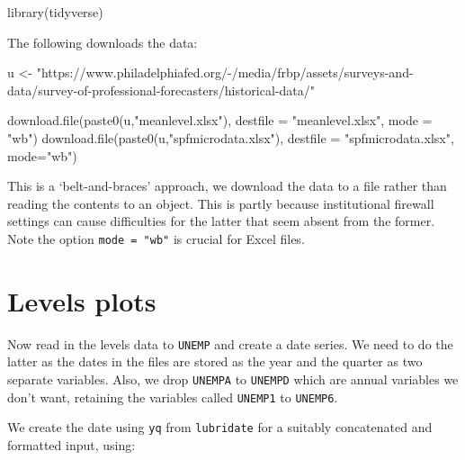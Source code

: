 \documentclass[
  letterpaper,
]{book}
\newenvironment{Shaded}{\begin{snugshade}}{\end{snugshade}}
\newcommand{\AttributeTok}[1]{\textcolor[rgb]{0.40,0.45,0.13}{#1}}
\newcommand{\FunctionTok}[1]{\textcolor[rgb]{0.28,0.35,0.67}{#1}}
\newcommand{\NormalTok}[1]{\textcolor[rgb]{0.00,0.23,0.31}{#1}}
\newcommand{\OtherTok}[1]{\textcolor[rgb]{0.00,0.23,0.31}{#1}}
\newcommand{\StringTok}[1]{\textcolor[rgb]{0.13,0.47,0.30}{#1}}
\begin{document}
\begin{Shaded}
\begin{Highlighting}[]
\FunctionTok{library}\NormalTok{(tidyverse)}
\end{Highlighting}
\end{Shaded}

The following downloads the data:

\begin{Shaded}
\begin{Highlighting}[]
\NormalTok{u }\OtherTok{\textless{}{-}} \StringTok{"https://www.philadelphiafed.org/{-}/media/frbp/assets/surveys{-}and{-}data/survey{-}of{-}professional{-}forecasters/historical{-}data/"}

\FunctionTok{download.file}\NormalTok{(}\FunctionTok{paste0}\NormalTok{(u,}\StringTok{"meanlevel.xlsx"}\NormalTok{), }\AttributeTok{destfile =} \StringTok{"meanlevel.xlsx"}\NormalTok{, }\AttributeTok{mode =} \StringTok{"wb"}\NormalTok{)}
\FunctionTok{download.file}\NormalTok{(}\FunctionTok{paste0}\NormalTok{(u,}\StringTok{"spfmicrodata.xlsx"}\NormalTok{), }\AttributeTok{destfile =} \StringTok{"spfmicrodata.xlsx"}\NormalTok{, }\AttributeTok{mode=}\StringTok{"wb"}\NormalTok{)}
\end{Highlighting}
\end{Shaded}

This is a `belt-and-braces' approach, we download the data to a file
rather than reading the contents to an object. This is partly because
institutional firewall settings can cause difficulties for the latter
that seem absent from the former. Note the option \texttt{mode\ =\ "wb"}
is crucial for Excel files.

\hypertarget{levels-plots}{%
\section{Levels plots}\label{levels-plots}}

Now read in the levels data to \texttt{UNEMP} and create a date series.
We need to do the latter as the dates in the files are stored as the
year and the quarter as two separate variables. Also, we drop
\texttt{UNEMPA} to \texttt{UNEMPD} which are annual variables we don't
want, retaining the variables called \texttt{UNEMP1} to \texttt{UNEMP6}.

We create the date using \texttt{yq} from \texttt{lubridate} for a
suitably concatenated and formatted input, using:
\end{document}

